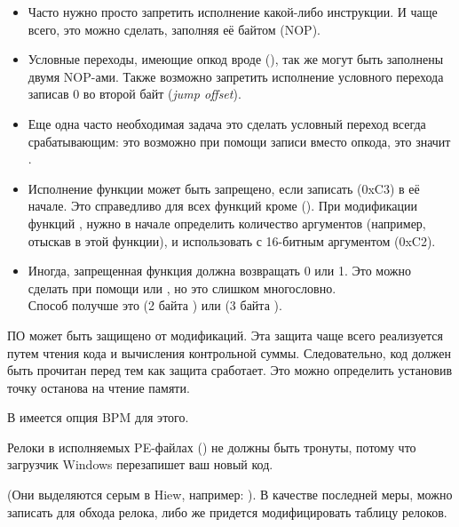 \begin{itemize}

\item Часто нужно просто запретить исполнение какой-либо инструкции.
И чаще всего, это можно сделать, заполняя её байтом 
 (\ac{NOP}).

\item Условные переходы, имеющие опкод вроде  (\JZ), 
так же могут быть заполнены двумя \ac{NOP}-ами.
Также возможно запретить исполнение условного перехода записав 0 во второй байт (\emph{jump offset}).

\item Еще одна часто необходимая задача это сделать условный переход всегда срабатывающим: 
это возможно при помощи записи  
вместо опкода, это значит \JMP.

\item Исполнение функции может быть запрещено, если записать
\RETN (0xC3) в её начале.
Это справедливо для всех функций кроме  
().
При модификации функций , нужно в начале определить количество аргументов 
(например, отыскав \RETN в этой функции),
и использовать \RETN с 16-битным аргументом (0xC2).

\item Иногда, запрещенная функция должна возвращать 0 или 1.
Это можно сделать при помощи  или , 
но это слишком многословно.\\
Способ получше это  (2 байта ) или  (3 байта ).

\end{itemize}

ПО может быть защищено от модификаций.
Эта защита чаще всего реализуется путем чтения кода и вычисления контрольной суммы.
Следовательно, код должен быть прочитан перед тем как защита сработает.
Это можно определить установив точку останова на чтение памяти.

В \tracer имеется опция BPM для этого.

Релоки в исполняемых PE-файлах () 
не должны быть тронуты, потому что загрузчик Windows перезапишет ваш новый код.

(Они выделяются серым в Hiew, например: ).
В качестве последней меры, можно записать \JMP для обхода релока, либо же придется модифицировать таблицу
релоков.


